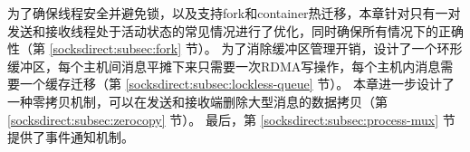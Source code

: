 为了确保线程安全并避免锁，以及支持fork和container热迁移，本章针对只有一对发送和接收线程处于活动状态的常见情况进行了优化，同时确保所有情况下的正确性（第 \ref {socksdirect:subsec:fork} 节）。
为了消除缓冲区管理开销，设计了一个环形缓冲区，每个主机间消息平摊下来只需要一次RDMA写操作，每个主机内消息需要一个缓存迁移（第 \ref {socksdirect:subsec:lockless-queue}  节）。
本章进一步设计了一种零拷贝机制，可以在发送和接收端删除大型消息的数据拷贝（第 \ref {socksdirect:subsec:zerocopy} 节）。
最后，第 \ref {socksdirect:subsec:process-mux} 节提供了事件通知机制。



